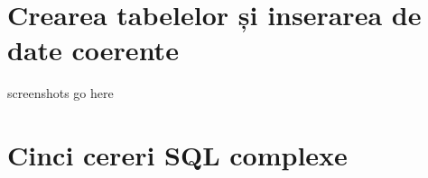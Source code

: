 \documentclass[a4paper, oneside, 12pt]{article}
\newcommand{\rowstyle}[1]{\gdef\currentrowstyle{#1}%
  #1\ignorespaces
}
\begin{document}
\begin{table}[H]
\centering
\caption*{Tabela \textbf{SUBSCRIPTION\_1}:}
\end{table}

\begin{table}[H]
\centering
\caption*{Tabela \textbf{SUBSCRIPTION\_2}:}
\end{table}

\section{Crearea tabelelor și inserarea de date coerente}

screenshots go here

\section{Cinci cereri SQL complexe}

\begin{center}

\minipage{\linewidth}

\endminipage

\minipage{\linewidth}

\endminipage

\minipage{\linewidth}

\endminipage

\minipage{\linewidth}

\endminipage

\minipage{\linewidth}

\endminipage

\end{center}
\end{document}
